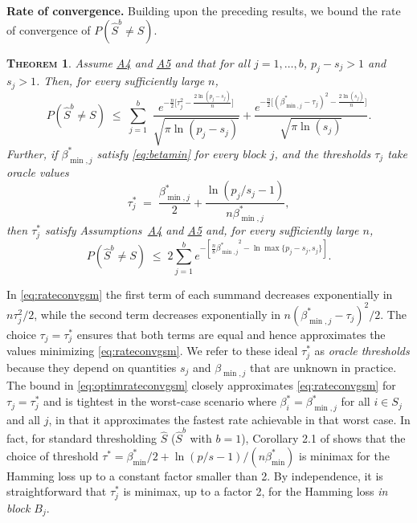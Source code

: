\documentclass[bj,authoryear]{imsart}
\theoremstyle{plain}
\newtheorem{thm}{\textsc{Theorem}}[section]
\newcommand{\david}[1]{{\small{\color{blue} \sf $\heartsuit$ [David: #1]}}}
\newcommand{\paul}[1]{{\small{\color{green} \sf $\spadesuit$ Paul: #1}}}
\begin{document}
\noindent\textbf{Rate of convergence.} Building upon the
preceding results, we bound the rate of convergence of $P(\hat S^{b}\neq S)$.
\begin{thm}\label{theo:fullrecovGS}
Assume \hyperlink{lab:A4}{A4} and \hyperlink{lab:A5}{A5} and that for all $j=1,\ldots,b$, $p_j-s_j>1$ and $s_j>1$. %
Then, for every sufficiently large $n$,
\begin{equation} \label{eq:rateconvgsm}
P(\hat{S}^{b} \neq S)\;\leq\;\sum_{j=1}^b\,\,\frac{e^{-\tfrac{n}{2}\big[\tau_j^2-\tfrac{2\ln(p_j-s_j)}{n}\big]}}{\sqrt{\pi\ln(p_j-s_j)}}+\frac{e^{-\tfrac{n}{2}\big[(\beta^*_{\min,j}-\tau_j)^2-\tfrac{2\ln(s_j)}{n}\big]}}{\sqrt{\pi\ln(s_j)}}.
\end{equation}
Further,
if $\beta^*_{\min,j}$ satisfy \eqref{eq:betamin} for every block $j$, and the thresholds $\tau_j$ take oracle values
	\begin{equation} \label{eq:optimtauj}
\tau^*_j \;=\; \frac{\beta^*_{\min,j}}{2}+\frac{\ln({p_j/s_j}-1)}{n\beta^*_{\min,j}},
\end{equation}
then $\tau^*_j$ satisfy Assumptions~\hyperlink{lab:A4}{A4} and \hyperlink{lab:A5}{A5} and, for every sufficiently large $n$,
\begin{equation}\label{eq:optimrateconvgsm}
    P(\hat{S}^{b} \neq S) \; \leq \; 2 \sum_{j=1}^be^{-[\frac{n}{8}{\beta^*_{\min,j}}^2-\ln \max\{p_j-s_j,s_j\}]}.
\end{equation}
\end{thm}
In \eqref{eq:rateconvgsm} the first term of each summand decreases exponentially in $n\tau_j^2/2$, while the second term decreases exponentially in $n(\beta_{\min,j}^*-\tau_j)^2/2$. The choice $\tau_j=\tau^*_j$ ensures that both terms are equal and hence approximates the values minimizing \eqref{eq:rateconvgsm}. We refer to these ideal $\tau^*_j$ as {\it oracle thresholds} because they depend on quantities $s_j$ and $\beta_{\min,j}$ that are unknown in practice. 
The bound in \eqref{eq:optimrateconvgsm} closely approximates \eqref{eq:rateconvgsm} for $\tau_j=\tau^*_j$ and is tightest in the worst-case scenario where $\beta_i^*=\beta_{\min,j}^*$ for all $i \in S_j$ and all $j$, in that it approximates the fastest rate achievable in that worst case. In fact, for standard thresholding $\hat{S}$ ($\hat{S}^b$ with $b=1$), Corollary 2.1 of \cite{butucea2018} shows that the choice of threshold $\tau^*=\beta^*_{\min}/2+\ln({p/s-1})/(n\beta^*_{\min})$ is minimax for the Hamming loss up to a constant factor smaller than 2. By independence, it is straightforward that $\tau_j^*$ is minimax, up to a factor 2, for the Hamming loss \textit{in block $B_j$}.
\end{document}
